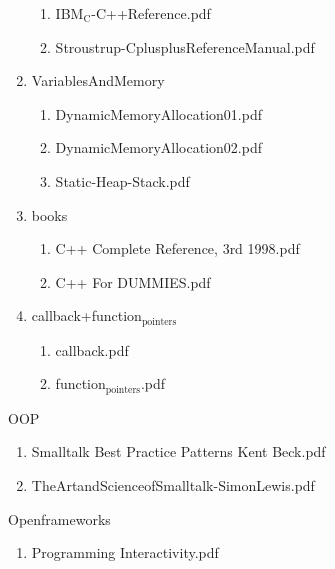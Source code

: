\documentclass[11pt]{article}
\begin{document}
\begin{enumerate}
\begin{enumerate}
\item IBM$_{\text{C}}$-C++Reference.pdf
\label{sec-1-1-1-1-38-5-4-3}

\item Stroustrup-CplusplusReferenceManual.pdf
\label{sec-1-1-1-1-38-5-4-4}
\end{enumerate}

\item VariablesAndMemory
\label{sec-1-1-1-1-38-5-5}
\begin{enumerate}
\item DynamicMemoryAllocation01.pdf
\label{sec-1-1-1-1-38-5-5-1}

\item DynamicMemoryAllocation02.pdf
\label{sec-1-1-1-1-38-5-5-2}

\item Static-Heap-Stack.pdf
\label{sec-1-1-1-1-38-5-5-3}
\end{enumerate}

\item books
\label{sec-1-1-1-1-38-5-6}
\begin{enumerate}
\item C++ Complete Reference, 3rd 1998.pdf
\label{sec-1-1-1-1-38-5-6-1}

\item C++ For DUMMIES.pdf
\label{sec-1-1-1-1-38-5-6-2}
\end{enumerate}

\item callback+function$_{\text{pointers}}$
\label{sec-1-1-1-1-38-5-7}
\begin{enumerate}
\item callback.pdf
\label{sec-1-1-1-1-38-5-7-1}

\item function$_{\text{pointers}}$.pdf
\label{sec-1-1-1-1-38-5-7-2}
\end{enumerate}
\end{enumerate}

\item OOP
\label{sec-1-1-1-1-38-6}
\begin{enumerate}
\item Smalltalk Best Practice Patterns Kent Beck.pdf
\label{sec-1-1-1-1-38-6-1}

\item TheArtandScienceofSmalltalk-SimonLewis.pdf
\label{sec-1-1-1-1-38-6-2}
\end{enumerate}

\item Openframeworks
\label{sec-1-1-1-1-38-7}
\begin{enumerate}
\item Programming Interactivity.pdf
\label{sec-1-1-1-1-38-7-1}
\end{enumerate}
\end{document}
